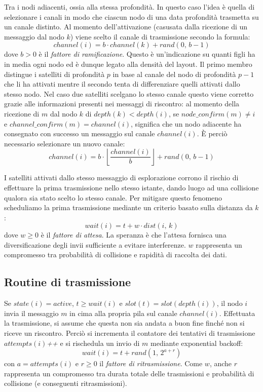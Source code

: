 \documentclass[a4paper,11pt]{article}
\theoremstyle{definition}
\begin{document}
Tra i nodi adiacenti, ossia alla stessa profondità. In questo caso l'idea è quella di selezionare i canali in modo che ciascun nodo di una data profondità trasmetta su un canale distinto. Al momento dell'attivazione (casusata dalla ricezione di un messaggio dal nodo $k$) viene scelto il canale di trasmissione secondo la formula:
\begin{equation*}
channel(i) = b \cdot channel(k) + rand(0,\,b-1)
\end{equation*}
dove $b > 0$ è il \emph{fattore di ramificazione}. Questo è un'indicazione su quanti figli ha in media ogni nodo ed è dunque legato alla densità del layout. Il primo membro distingue i satelliti di profondità $p$ in base al canale del nodo di profondità $p-1$ che li ha attivati mentre il secondo tenta di differenziare quelli attivati dallo stesso nodo. Nel caso due satelliti scelgano lo stesso canale questo viene corretto grazie alle informazioni presenti nei messaggi di riscontro: al momento della ricezione di $m$ dal nodo $k$ di $depth(k) < depth(i)$, se $node\_confirm(m) \neq i$ e $channel\_confirm(m) = channel(i)$, significa che un nodo adiacente ha consegnato con successo un messaggio sul canale $channel(i)$. È perciò necessario selezionare un nuovo canale:
\begin{equation*}
channel(i) = b \cdot \left\lfloor\frac{channel(i)}{b}\right\rfloor + rand(0,\,b-1)
\end{equation*}

I satelliti attivati dallo stesso messaggio di esplorazione corrono il rischio di effettuare la prima trasmissione nello stesso istante, dando luogo ad una collisione qualora sia stato scelto lo stesso canale. Per mitigare questo fenomeno scheduliamo la prima trasmissione mediante un criterio basato sulla distanza da $k$:
\begin{equation*}
wait(i) = t + w \cdot dist(i,\,k)
\end{equation*}
dove $w \geq 0$ è il \emph{fattore di attesa}. La speranza è che l'attesa fornisca una diversificazione degli invii sufficiente a evitare interferenze. $w$ rappresenta un compromesso tra probabilità di collisione e rapidità di raccolta dei dati.

\subsection{Routine di trasmissione}

Se $state(i) = active$, $t \geq wait(i)$ e $slot(t) = slot(depth(i))$, il nodo $i$ invia il messaggio $m$ in cima alla propria pila sul canale $channel(i)$. Effettuata la trasmissione, si assume che questa non sia andata a buon fine finché non si riceve un riscontro. Perciò si incrementa il contatore dei tentativi di trasmissione $attempts(i)$\textit{++} e si rischedula un invio di $m$ mediante exponential backoff:
\begin{equation*}
wait(i) = t + rand(1,\,2^{a+r})
\end{equation*}
con $a = attempts(i)$ e $r \geq 0$ il \emph{fattore di ritrasmissione}. Come $w$, anche $r$ rappresenta un compromesso tra durata totale delle trasmissioni e probabilità di collisione (e conseguenti ritrasmissioni).
\end{document}
